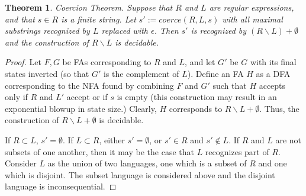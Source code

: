 \documentclass[10pt,preprint]{sigplanconf}
\newtheorem{thm}{Theorem}
\theoremstyle{definition}
\begin{document}
\begin{thm}{Coercion Theorem.} \label{thm:coerce}
Suppose that $R$ and $L$ are regular expressions, and that $s \in R$ is a finite string.  Let $s' := coerce(R,L,s)$ with all maximal substrings recognized by $L$ replaced with $\epsilon$.  Then $s'$ is recognized by $(R \backslash L) + \emptyset$ and the construction of $R \backslash L$ is decidable.
\end{thm}
\begin{proof}
Let $F,G$ be FAs corresponding to $R$ and $L$, and let $G'$ be $G$ with its final states inverted (so that $G'$ is the complement of $L$).  Define an FA $H$ as a DFA corresponding to the NFA found by combining $F$ and $G'$ such that $H$ accepts only if $R$ and $L'$ accept or if $s$ is empty (this construction may result in an exponential blowup in state size.)  Clearly, $H$ corresponds to $R \backslash L + \emptyset$.  Thus, the construction of $R \backslash L + \emptyset$ is decidable.

If $R \subset L$, $s' = \emptyset$.  If $L \subset R$, either $s' = \emptyset$, or $s' \in R$ and $s' \not \in L$. If $R$ and $L$ are not subsets of one another, then it may be the case that $L$ recognizes part of $R$.  Consider $L$ as the union of two languages, one which is a subset of $R$ and one which is disjoint.  The subset language is considered above and the disjoint language is inconsequential.
\end{proof}


%
%
\end{document}
